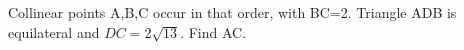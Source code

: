 Collinear points A,B,C occur in that order, with BC=2. Triangle ADB is equilateral and $DC=2\sqrt{13}$. Find AC.
